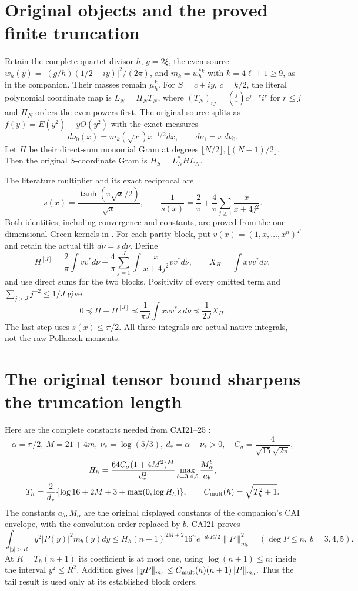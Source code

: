 \section{Original objects and the proved finite truncation}
Retain the complete quartet divisor $h$, $g=2\xi$, the even source
$w_h(y)=|(g/h)(1/2+iy)|^2/(2\pi)$, and $m_k=w_h^{*k}$ with
$k=4\ell+1\ge9$, as in the companion. Their masses remain
$\mu_h^k$. For $S=c+iy$, $c=k/2$, the literal polynomial coordinate
map is $L_N=\Pi_NT_N$, where
$(T_N)_{rj}=\binom jr c^{j-r}i^r$ for $r\le j$ and $\Pi_N$ orders
the even powers first. The original source splits as
$f(y)=E(y^2)+yO(y^2)$ with the exact measures
\[
 d\nu_0(x)=m_k(\sqrt x)x^{-1/2}dx,\qquad d\nu_1=x\,d\nu_0.
\]
Let $H$ be their direct-sum monomial Gram at degrees
$\lfloor N/2\rfloor,\lfloor(N-1)/2\rfloor$. Then the original
$S$-coordinate Gram is $H_S=L_N^*HL_N$.

The literature multiplier and its exact reciprocal are
\[
 s(x)=\frac{\tanh(\pi\sqrt x/2)}{\sqrt x},\qquad
 \frac1{s(x)}=\frac2\pi+\frac4\pi\sum_{j\ge1}\frac{x}{x+4j^2}.
\]
Both identities, including convergence and constants, are proved from
the one-dimensional Green kernels in \cite{nativecut:PP}. For each parity block,
put $v(x)=(1,x,\ldots,x^n)^T$ and retain the actual tilt
$d\widetilde\nu=s\,d\nu$. Define
\[
 H^{[J]}=\frac2\pi\int vv^*d\widetilde\nu
 +\frac4\pi\sum_{j=1}^J\int\frac{x}{x+4j^2}vv^*d\widetilde\nu,
 \qquad X_H=\int xvv^*d\nu,
\]
and use direct sums for the two blocks. Positivity of every omitted
term and $\sum_{j>J}j^{-2}\le1/J$ give
\begin{equation}\tag{TR1}\label{nativecut:eq:tail}
 0\preceq H-H^{[J]}\preceq\frac1{\pi J}\int xvv^*s\,d\nu
                                  \preceq\frac1{2J}X_H.
\end{equation}
The last step uses $s(x)\le\pi/2$. All three integrals are actual
native integrals, not the raw Pollaczek moments.

\section{The original tensor bound sharpens the truncation length}
Here are the complete constants needed from CAI21--25 \cite{nativecut:CAI}:
\[
 \alpha=\pi/2,\ M=21+4m,\ \nu_*=\log(5/3),\ d_* =\alpha-\nu_*>0,
 \quad C_\sigma=\frac4{\sqrt{15}\sqrt{2\pi}},
\]
\[
 \begin{gathered}
 H_h=\frac{64C_\sigma(1+4M^2)^M}{d_*^2}
             \max_{b=3,4,5}\frac{M_\alpha^b}{a_b},\\
 T_h=\frac2{d_*}\{\log16+2M+3+\max(0,\log H_h)\},\qquad
 C_{\rm mult}(h)=\sqrt{T_h^2+1}.
 \end{gathered}
\]
The constants $a_b,M_\alpha$ are the original displayed constants
of the companion's CAI envelope, with the convolution order replaced
by $b$. CAI21 proves
\[
 \int_{|y|>R}y^2|P(y)|^2m_b(y)dy
 \le H_h(n+1)^{2M+2}16^ne^{-d_*R/2}\|P\|_{m_b}^2
 \quad(\deg P\le n,\ b=3,4,5).
\]
At $R=T_h(n+1)$ its coefficient is at most one, using
$\log(n+1)\le n$; inside the interval $y^2\le R^2$. Addition gives
$\|yP\|_{m_b}\le C_{\rm mult}(h)(n+1)\|P\|_{m_b}$.
Thus the tail result is used only at its established block orders.

